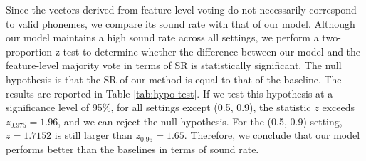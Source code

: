 


Since the vectors derived from feature-level voting do not necessarily correspond to valid phonemes, we compare its sound rate with that of our model. Although our model maintains a high sound rate across all settings, we perform a two-proportion z-test to determine whether the difference between our model and the feature-level majority vote in terms of SR is statistically significant. The null hypothesis is that the SR of our method is equal to that of the baseline. The results are reported in Table \ref{tab:hypo-test}. If we test this hypothesis at a significance level of 95\%, for all settings except (0.5, 0.9), the statistic $z$
exceeds $z_{0.975}=1.96$, and we can reject the null hypothesis. For the (0.5, 0.9) setting, $z=1.7152$ is still larger than $z_{0.95}=1.65$. 
Therefore, we conclude that our model performs better than the baselines in terms of sound rate.

